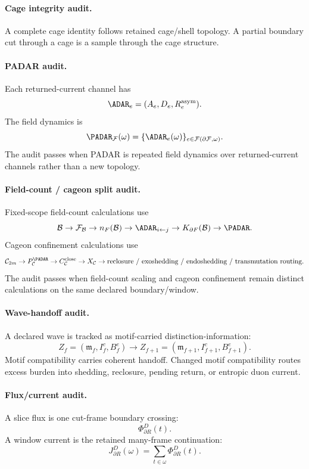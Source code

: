 \paragraph{Cage integrity audit.}
A complete cage identity follows retained cage/shell topology. A partial boundary cut through a cage is a sample through the cage structure.

\paragraph{PADAR audit.}
Each returned-current channel has
\[
\ADAR_e=(A_e,D_e,R^{\mathrm{asym}}_e).
\]
The field dynamics is
\[
\PADAR_{\mathcal F}(\omega)=\{\ADAR_e(\omega)\}_{e\in\mathcal F(\partial\mathcal F,\omega)}.
\]
The audit passes when PADAR is repeated field dynamics over returned-current channels rather than a new topology.

\paragraph{Field-count / cageon split audit.}
Fixed-scope field-count calculations use
\[
\mathcal B\to \mathcal F_{\mathcal B}\to n_F(\mathcal B)\to \ADAR_{i\leftarrow j}\to K_{\partial F}(\mathcal B)\to \PADAR.
\]
Cageon confinement calculations use
\[
\mathcal C_{2m}\to P_{\mathcal C}^{\PADAR}\to C_{\mathcal C}^{\mathrm{close}}\to X_{\mathcal C}\to
\text{reclosure / exoshedding / endoshedding / transmutation routing}.
\]
The audit passes when field-count scaling and cageon confinement remain distinct calculations on the same declared boundary/window.

\paragraph{Wave-handoff audit.}
A declared wave is tracked as motif-carried distinction-information:
\[
Z_f=(\mathfrak m_f,I^c_f,B^e_f)
\to
Z_{f+1}=(\mathfrak m_{f+1},I^c_{f+1},B^e_{f+1}).
\]
Motif compatibility carries coherent handoff. Changed motif compatibility routes excess burden into shedding, reclosure, pending return, or entropic duon current.

\paragraph{Flux/current audit.}
A slice flux is one cut-frame boundary crossing:
\[
\Phi^D_{\partial R}(t).
\]
A window current is the retained many-frame continuation:
\[
J^D_{\partial R}(\omega)
=
\sum_{t\in\omega}\Phi^D_{\partial R}(t).
\]
